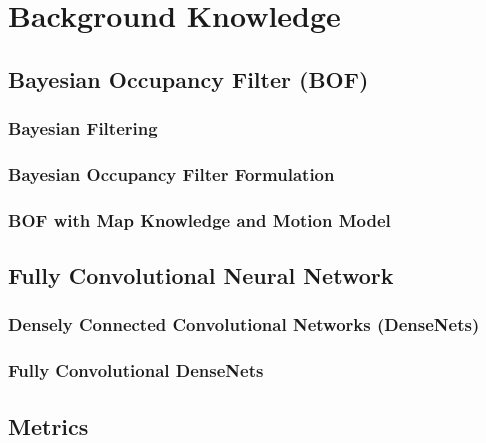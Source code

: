 \chapter{Background Knowledge}
%
\section{Bayesian Occupancy Filter (BOF)} 

\subsection{Bayesian Filtering}

\subsection{Bayesian Occupancy Filter Formulation}

\subsection{BOF with Map Knowledge and Motion Model}

\section{Fully Convolutional Neural Network}

\subsection{Densely Connected Convolutional Networks (DenseNets)}

\subsection{Fully Convolutional DenseNets}

\section{Metrics}